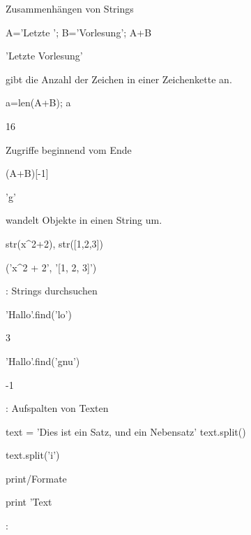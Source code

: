 \documentclass[fontsize=12pt,paper=a4,twoside,bibtotoc,idxtotoc,
liststotoc,pagesize,BCOR1.2cm,DIV15,chapterprefix,pagesize=pdftex]{scrbook}
\theoremstyle{plain}
\theoremstyle{definition}
\theoremstyle{remark}
\begin{document}
 Zusammenhängen von Strings
\begin{sagein}
A='Letzte '; B='Vorlesung'; A+B
\end{sagein}
\begin{sage}
'Letzte Vorlesung'
\end{sage}
  gibt die Anzahl der Zeichen in einer Zeichenkette
an.
\begin{sagein}
a=len(A+B); a
\end{sagein}
\begin{sage}
  16
\end{sage}
  Zugriffe beginnend vom Ende
\begin{sagein}
(A+B)[-1]
\end{sagein}
\begin{sage}
  'g'
\end{sage}
 {\color{blue} } wandelt Objekte in einen String um.
\begin{sagein}
str(x^2+2), str([1,2,3])
\end{sagein}
\begin{sage}
('x^2 + 2', '[1, 2, 3]')
\end{sage}
 : Strings durchsuchen
\begin{sagein}
'Hallo'.find('lo')
\end{sagein}
\begin{sage}
3
\end{sage}
 
\begin{sagein}
'Hallo'.find('gnu')
\end{sagein}
\begin{sage}
-1
\end{sage}
 : Aufspalten von Texten
\begin{sagein}
text = 'Dies ist ein Satz, und ein Nebensatz'
text.split() 
\end{sagein}
\begin{sage}
\end{sage}
\begin{sagein}
text.split('i')
\end{sagein}
\begin{sage}
\end{sage}


print/Formate

\begin{sagein}
  print 'Text %
 \end{sagein}
:
\begin{sagein}
\end{sagein}
\end{document}
